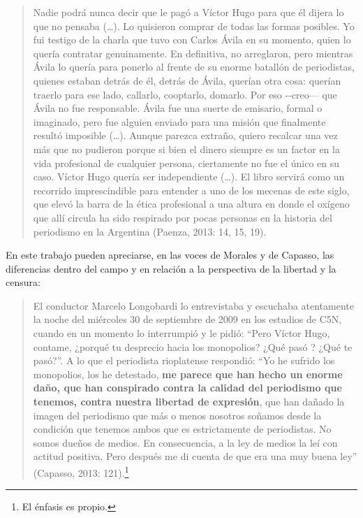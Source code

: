 \begin{quote}
Nadie podrá nunca decir que le pagó a Víctor Hugo para que él dijera lo que no pensaba (\ldots). Lo quisieron comprar de todas las formas posibles. Yo fui testigo de la charla que tuvo con Carlos Ávila en su momento, quien lo quería contratar genuinamente. En definitiva, no arreglaron, pero mientras Ávila lo quería para ponerlo al frente de su enorme batallón de periodistas, quienes estaban detrás de él, detrás de Ávila, querían otra cosa: querían traerlo para ese lado, callarlo, cooptarlo, domarlo. Por eso -\/-creo--- que Ávila no fue responsable. Ávila fue una suerte de emisario, formal o imaginado, pero fue alguien enviado para una misión que finalmente resultó imposible (\ldots). Aunque parezca extraño, quiero recalcar una vez más que no pudieron porque si bien el dinero siempre es un factor en la vida profesional de cualquier persona, ciertamente no fue el único en su caso. Víctor Hugo quería ser independiente (\ldots). El libro servirá como un recorrido imprescindible para entender a uno de los mecenas de este siglo, que elevó la barra de la ética profesional a una altura en donde el oxígeno que allí circula ha sido respirado por pocas personas en la historia del periodismo en la Argentina (Paenza, 2013: 14, 15, 19).
\end{quote}

En este trabajo pueden apreciarse, en las voces de Morales y de Capasso, las diferencias dentro del campo y en relación a la perspectiva de la libertad y la censura:

\begin{quote}
El conductor Marcelo Longobardi lo entrevistaba y escuchaba atentamente la noche del miércoles 30 de septiembre de 2009 en los estudios de C5N, cuando en un momento lo interrumpió y le pidió: ``Pero Víctor Hugo, contame, ¿porqué tu desprecio hacia los monopolios? ¿Qué pasó ? ¿Qué te pasó?''. A lo que el periodista rioplatense respondió: ``Yo he sufrido los monopolios, los he detestado, \textbf{me parece que han hecho un enorme daño, que han conspirado contra la calidad del periodismo que tenemos, contra nuestra libertad de expresión}, que han dañado la imagen del periodismo que más o menos nosotros soñamos desde la condición que tenemos ambos que es estrictamente de periodistas. No somos dueños de medios. En consecuencia, a la ley de medios la leí con actitud positiva. Pero después me di cuenta de que era una muy buena ley'' (Capasso, 2013: 121).\footnote{El énfasis es propio.}
\end{quote}


